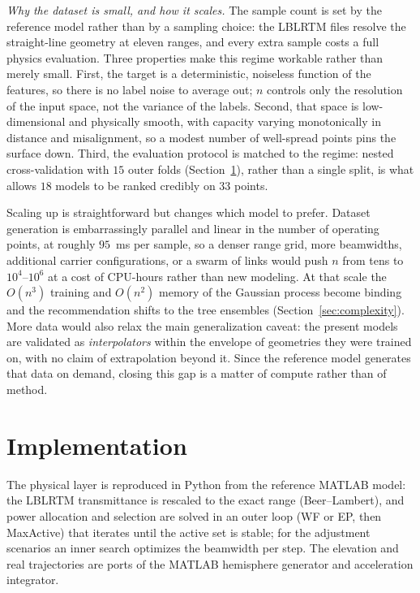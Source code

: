 \documentclass[journal]{IEEEtran}
\newcommand{\PLMASTEP}{$95$~ms}       %
\begin{document}
\emph{Why the dataset is small, and how it scales.} The sample count is set by the
reference model rather than by a sampling choice: the LBLRTM files resolve the
straight-line geometry at eleven ranges, and every extra sample costs a full physics
evaluation. Three properties make this regime workable rather than merely small. First,
the target is a deterministic, noiseless function of the features, so there is no label
noise to average out; $n$ controls only the resolution of the input space, not the
variance of the labels. Second, that space is low-dimensional and physically smooth, with
capacity varying monotonically in distance and misalignment, so a modest number of
well-spread points pins the surface down. Third, the evaluation protocol is matched to the
regime: nested cross-validation with $15$ outer folds (Section~\ref{sec:impl}), rather
than a single split, is what allows $18$ models to be ranked credibly on $33$ points.

Scaling up is straightforward but changes which model to prefer. Dataset generation is
embarrassingly parallel and linear in the number of operating points, at roughly
\PLMASTEP{} per sample, so a denser range grid, more beamwidths, additional carrier
configurations, or a swarm of links would push $n$ from tens to $10^4$--$10^6$ at a cost
of CPU-hours rather than new modeling. At that scale the $O(n^3)$ training and $O(n^2)$
memory of the Gaussian process become binding and the recommendation shifts to the tree
ensembles (Section~\ref{sec:complexity}). More data would also relax the main
generalization caveat: the present models are validated as \emph{interpolators} within the
envelope of geometries they were trained on, with no claim of extrapolation beyond it.
Since the reference model generates that data on demand, closing this gap is a matter of
compute rather than of method.

\section{Implementation}
\label{sec:impl}
The physical layer is reproduced in Python from the reference MATLAB model: the LBLRTM
transmittance is rescaled to the exact range (Beer--Lambert), and power allocation and
selection are solved in an outer loop (WF or EP, then MaxActive) that iterates until
the active set is stable; for the adjustment scenarios an inner search optimizes the
beamwidth per step. The elevation and real trajectories are ports of the MATLAB
hemisphere generator and acceleration integrator.
\end{document}
